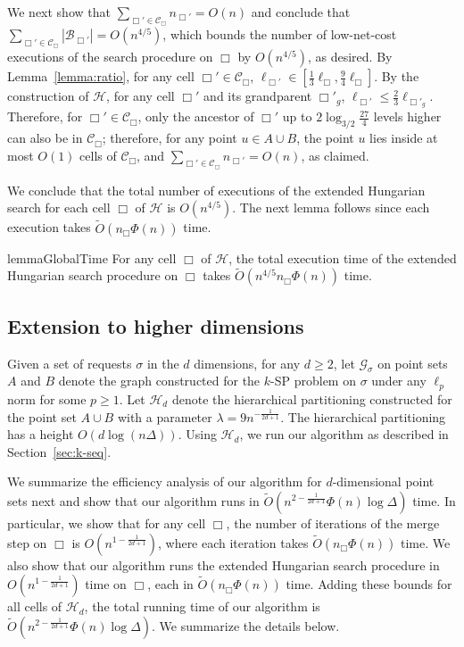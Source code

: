 \documentclass[11pt,onecolumn]{article}
\def\mcB{{\mathcal{B}}}
\def\mcC{{\mathcal{C}}}
\def\mcG{{\mathcal{G}}}
\def\mcH{{\mathcal{H}}}
\newcommand{\cell}{\Box}
\newcommand{\requests}{\sigma}
\begin{document}
We next show that $\sum_{\cell'\in\mcC_{\cell}}n_{\cell'}=O(n)$ and conclude that $\sum_{\cell'\in\mcC_\cell}|\mcB_{\cell'}| = O(n^{4/5})$, which bounds the number of low-net-cost executions of the search procedure on $\cell$ by $O(n^{4/5})$, as desired.
By Lemma~\ref{lemma:ratio}, for any cell $\cell'\in\mcC_{\cell}$, $\ell_{\cell'}\in[\frac{1}{3}\ell_\cell, \frac{9}{4}\ell_\cell]$. By the construction of $\mcH$, for any cell $\cell'$ and its grandparent $\cell'_g$, $\ell_{\cell'}\le \frac{2}{3}\ell_{\cell'_g}$. Therefore, for $\cell'\in \mcC_\cell$, only the ancestor of $\cell'$ up to $2\log_{3/2} \frac{27}{4}$ levels higher can also be in $\mcC_\cell$; therefore, for any point $u\in A\cup B$, the point $u$ lies inside at most $O(1)$ cells of $\mcC_\cell$, and $\sum_{\cell'\in\mcC_{\cell}}n_{\cell'}=O(n)$, as claimed.

We conclude that the total number of executions of the extended Hungarian search for each cell $\cell$ of $\mcH$ is $O(n^{4/5})$. The next lemma follows since each execution takes $\tilde{O}(n_\cell\Phi(n))$ time.
\begin{restatable}{lemma}{GlobalTime}\label{lemma:global-time}
    For any cell $\cell$ of $\mcH$, the total execution time of the extended Hungarian search procedure on $\cell$ takes $\tilde{O}(n^{4/5}n_\cell\Phi(n))$ time.
\end{restatable}











\subsection{Extension to higher dimensions}\label{sec:appendix-high-d-ksp}
Given a set of requests $\requests$ in the $d$ dimensions, for any $d\ge 2$, let $\mcG_\requests$ on point sets $A$ and $B$ denote the graph constructed for the $k$-SP problem on $\requests$ under any $\ell_p$ norm for some $p\ge 1$. Let $\mcH_d$ denote the hierarchical partitioning constructed for the point set $A\cup B$ with a parameter $\lambda = 9n^{-\frac{1}{2d+1}}$. 
The hierarchical partitioning has a height $O(d\log(n\Delta))$. Using $\mcH_d$, we run our algorithm as described in Section~\ref{sec:k-seq}. 

We summarize the efficiency analysis of our algorithm for $d$-dimensional point sets next and show that our algorithm runs in $\tilde{O}(n^{2-\frac{1}{2d+1}}\Phi(n)\log \Delta)$ time. In particular, we show that for any cell $\cell$, the number of iterations of the merge step on $\cell$ is $O(n^{1-\frac{1}{2d+1}})$, where each iteration takes $\tilde{O}(n_\cell\Phi(n))$ time. We also show that our algorithm runs the extended Hungarian search procedure in $O(n^{1-\frac{1}{2d+1}})$ time on $\cell$, each in $\tilde{O}(n_\cell\Phi(n))$ time. Adding these bounds for all cells of $\mcH_d$, the total running time of our algorithm is $\tilde{O}(n^{2-\frac{1}{2d+1}}\Phi(n)\log\Delta)$. We summarize the details below.
\end{document}
